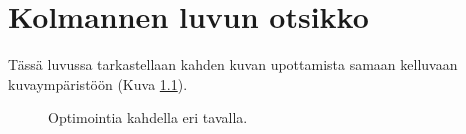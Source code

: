 \chapter{Kolmannen luvun otsikko} \label{Kolmas luku}

Tässä luvussa tarkastellaan kahden kuvan upottamista samaan kelluvaan
kuvaympäristöön (Kuva \ref{fig:Optimointia-kahdella-eri}).

\begin{figure}[tbh]
\caption{Optimointia kahdella eri tavalla.\label{fig:Optimointia-kahdella-eri}}

\end{figure}